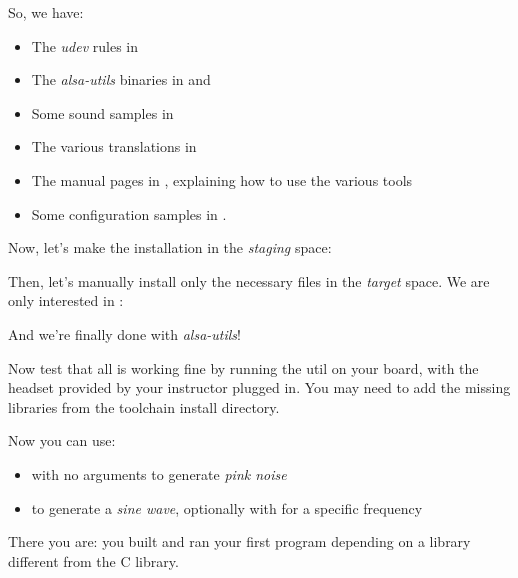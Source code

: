 So, we have:
\begin{itemize}
\item The {\em udev} rules in 
\item The {\em alsa-utils} binaries in  and 
\item Some sound samples in 
\item The various translations in 
\item The manual pages in , explaining how to
  use the various tools
\item Some configuration samples in .
\end{itemize}

Now, let's make the installation in the {\em staging} space:


Then, let's manually install only the necessary files in the {\em target}
space. We are only interested in :


And we're finally done with {\em alsa-utils}!

Now test that all is working fine by running the  util on
your board, with the headset provided by your instructor plugged
in. You may need to add the missing libraries from the toolchain
install directory.

Now you can use:

\begin{itemize}

\item {} with no arguments to generate {\em pink noise}

\item {} to generate a {\em sine wave},
optionally with  for a specific frequency

\end{itemize}

There you are: you built and ran your first program depending
on a library different from the C library.

